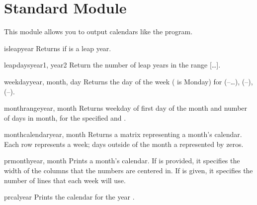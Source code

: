 
\section{Standard Module }
\label{module-calendar}


This module allows you to output calendars like the \UNIX{}
 program.

\begin{funcdesc}{isleap}{year}
Returns  if  is a leap year.
\end{funcdesc}

\begin{funcdesc}{leapdays}{year1, year2}
Return the number of leap years in the range
[\ldots{}].
\end{funcdesc}

\begin{funcdesc}{weekday}{year, month, day}
Returns the day of the week ( is Monday) for 
(--\dots),  (--), 
(--).
\end{funcdesc}

\begin{funcdesc}{monthrange}{year, month}
Returns weekday of first day of the month and number of days in month, 
for the specified  and .
\end{funcdesc}

\begin{funcdesc}{monthcalendar}{year, month}
Returns a matrix representing a month's calendar.  Each row represents
a week; days outside of the month a represented by zeros.
\end{funcdesc}

\begin{funcdesc}{prmonth}{year, month}
Prints a month's calendar.  If  is provided, it specifies
the width of the columns that the numbers are centered in.  If
 is given, it specifies the number of lines that each
week will use.
\end{funcdesc}

\begin{funcdesc}{prcal}{year}
Prints the calendar for the year .
\end{funcdesc}
